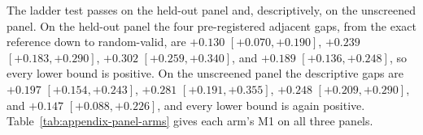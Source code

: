 The ladder test passes on the held-out panel and, descriptively, on the unscreened panel. On the held-out panel the four pre-registered adjacent gaps, from the exact reference down to random-valid, are $+0.130$ $[+0.070, +0.190]$, $+0.239$ $[+0.183, +0.290]$, $+0.302$ $[+0.259, +0.340]$, and $+0.189$ $[+0.136, +0.248]$, so every lower bound is positive. On the unscreened panel the descriptive gaps are $+0.197$ $[+0.154, +0.243]$, $+0.281$ $[+0.191, +0.355]$, $+0.248$ $[+0.209, +0.290]$, and $+0.147$ $[+0.088, +0.226]$, and every lower bound is again positive. Table~\ref{tab:appendix-panel-arms} gives each arm's M1 on all three panels.


